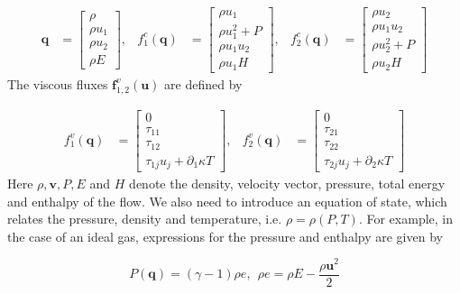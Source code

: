 \begin{align}
\label{eq:cNSFluxes}
    \textbf{q} &= \begin{bmatrix}
           \rho \\
           \rho u_1 \\
           \rho u_2 \\
           \rho E
         \end{bmatrix},&
    f_1^c(\textbf{q}) &= \begin{bmatrix}
           \rho u_1 \\
           \rho u_1^2 + P \\
           \rho u_1 u_2 \\
           \rho u_1 H
         \end{bmatrix},&
    f_2^c(\textbf{q}) &= \begin{bmatrix}
           \rho u_2 \\
           \rho u_1 u_2 \\
           \rho u_2^2 + P \\
           \rho u_2 H
         \end{bmatrix}
  \end{align}
The viscous fluxes $\textbf{f}^v_{1,2}(\textbf{u})$ are defined by

\begin{align}
    f_1^v(\textbf{q}) &= \begin{bmatrix}
           0 \\
           \tau_{11} \\
           \tau_{12} \\
           \tau_{1j}u_j + \partial_{1} \kappa T
         \end{bmatrix},&
     f_2^v(\textbf{q}) &= \begin{bmatrix}
           0 \\
           \tau_{21} \\
           \tau_{22} \\
           \tau_{2j}u_j + \partial_{2} \kappa T
         \end{bmatrix}
\end{align}
Here $\rho, \textbf{v}, P, E$ and $H$ denote the density, velocity vector, pressure, total energy and enthalpy of the flow. We also need to introduce an equation of state, which relates the pressure, density and temperature, i.e. $\rho = \rho(P,T)$. For example, in the case of an ideal gas, expressions for the pressure and enthalpy are given by

\begin{equation}
    P(\textbf{q}) = (\gamma - 1) \rho e, \ \ \rho e = \rho E - \frac{\rho \textbf{u}^2}{2}
\end{equation}

